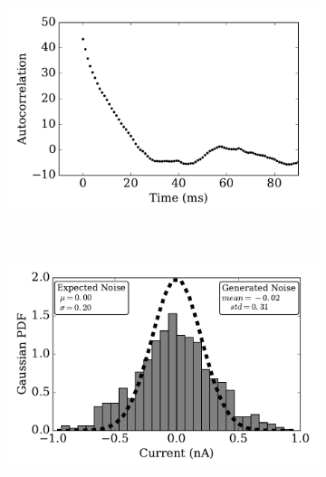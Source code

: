 \begin{figure}[tbp!]
\begin{subfigure}[t]{0.43\textwidth}
			\caption{}
		\end{subfigure}
		\begin{subfigure}[t]{0.43\textwidth}
			\includegraphics[width=\textwidth]{pics_iconip/autocorr_tau10.pdf}
			\caption{}
		\end{subfigure}\\
		\begin{subfigure}[t]{0.43\textwidth}
			\includegraphics[width=\textwidth]{pics_iconip/distr_tau1.pdf}
			\caption{}
		\end{subfigure}
		\begin{subfigure}[t]{0.43\textwidth}

\end{subfigure}
\end{figure}
